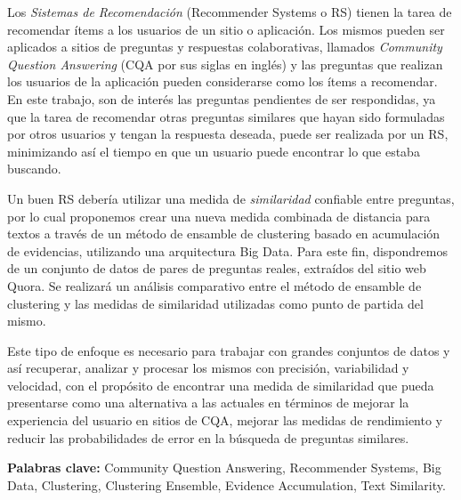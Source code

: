 \abstract

Los \textit{Sistemas de Recomendación} (Recommender Systems o RS) tienen la tarea de recomendar ítems a los usuarios de un sitio o aplicación. Los mismos pueden ser aplicados a sitios de preguntas y respuestas colaborativas, llamados \textit{Community Question Answering} (CQA por sus siglas en inglés) y las preguntas que realizan los usuarios de la aplicación pueden considerarse como los ítems a recomendar. En este trabajo, son de interés las preguntas pendientes de ser respondidas, ya que la tarea de recomendar otras preguntas similares que hayan sido formuladas por otros usuarios y tengan la respuesta deseada, puede ser realizada por un RS, minimizando así el tiempo en que un usuario puede encontrar lo que estaba buscando.

\bigskip Un buen RS debería utilizar una medida de \textit{similaridad} confiable entre preguntas, por lo cual proponemos crear una nueva medida combinada de distancia para textos a través de un método de ensamble de clustering basado en acumulación de evidencias, utilizando una arquitectura Big Data. Para este fin, dispondremos de un conjunto de datos de pares de preguntas reales, extraídos del sitio web Quora. Se realizará un análisis comparativo entre el método de ensamble de clustering y las medidas de similaridad utilizadas como punto de partida del mismo.

\bigskip Este tipo de enfoque es necesario para trabajar con grandes conjuntos de datos y así recuperar, analizar y procesar los mismos con precisión, variabilidad y velocidad, con el propósito de encontrar una medida de similaridad que pueda presentarse como una alternativa a las actuales en términos de mejorar la experiencia del usuario en sitios de CQA, mejorar las medidas de rendimiento y reducir las probabilidades de error en la búsqueda de preguntas similares.

\bigskip

\noindent\textbf{Palabras clave:} Community Question Answering, Recommender Systems, Big Data, Clustering, Clustering Ensemble, Evidence Accumulation, Text Similarity.